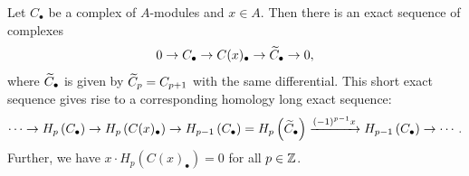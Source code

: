 \begin{theorem}
    Let $C_\bullet$ be a complex of $A$-modules and $x\in A$. Then there is an exact sequence of complexes 
    \begin{equation*}
        0\to C_\bullet\to C(x)_\bullet\to \widetilde{C}_\bullet\to 0,
    \end{equation*}
    where $\widetilde{C}_\bullet$ is given by $\widetilde{C}_p = C_{p + 1}$ with the same differential. This short exact sequence gives rise to a corresponding homology long exact sequence: 
    \begin{equation*}
        \cdots\to H_p\left(C_\bullet\right)\to H_p\left(C(x)_\bullet\right)\to H_{p - 1}\left(C_\bullet\right) = H_p\left(\widetilde{C}_\bullet\right)\xrightarrow{(-1)^{p - 1}x} H_{p - 1}\left(C_\bullet\right)\to\cdots.
    \end{equation*}
    Further, we have $x\cdot H_p\left(C(x)_\bullet\right) = 0$ for all $p\in\mathbb{Z}$.
\end{theorem}

